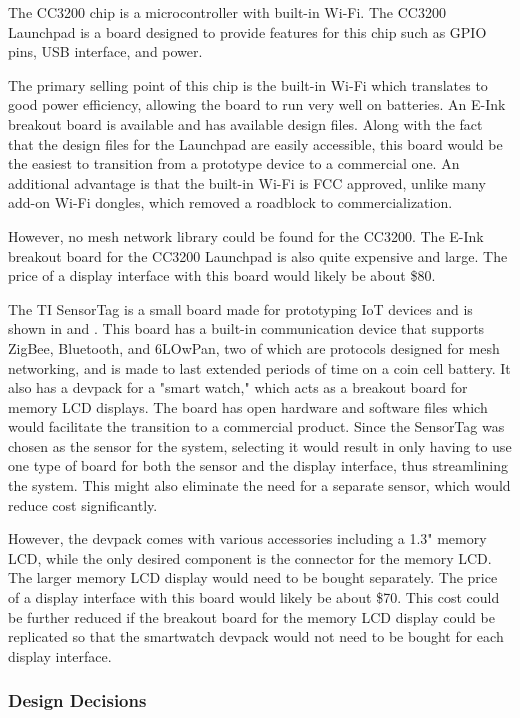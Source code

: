 \documentclass[PPFS.tex]{template/subfiles}
\begin{document}
The CC3200 chip is a microcontroller with built-in Wi-Fi. The CC3200 Launchpad is a board designed to provide features for this chip such as GPIO pins, USB interface, and power.

The primary selling point of this chip is the built-in Wi-Fi which translates to good power efficiency, allowing the board to run very well on batteries. An E-Ink breakout board is available and has available design files. Along with the fact that the design files for the Launchpad are easily accessible, this board would be the easiest to transition from a prototype device to a commercial one. An additional advantage is that the built-in Wi-Fi is FCC approved, unlike many add-on Wi-Fi dongles, which removed a roadblock to commercialization.

However, no mesh network library could be found for the CC3200. The E-Ink breakout board for the CC3200 Launchpad is also quite expensive and large. The price of a display interface with this board would likely be about \$80.

The TI SensorTag is a small board made for prototyping IoT devices and is shown in  and . This board has a built-in communication device that supports ZigBee, Bluetooth, and 6LOwPan, two of which are protocols designed for mesh networking, and is made to last extended periods of time on a coin cell battery. It also has a devpack for a "smart watch," which acts as a breakout board for memory LCD displays. The board has open hardware and software files which would facilitate the transition to a commercial product. Since the SensorTag was chosen as the sensor for the system, selecting it would result in only having to use one type of board for both the sensor and the display interface, thus streamlining the system. This might also eliminate the need for a separate sensor, which would reduce cost significantly.

However, the devpack comes with various accessories including a 1.3" memory LCD, while the only desired component is the connector for the memory LCD. The larger memory LCD display would need to be bought separately. The price of a display interface with this board would likely be about \$70. This cost could be further reduced if the breakout board for the memory LCD display could be replicated so that the smartwatch devpack would not need to be bought for each display interface.

\subsubsection{Design Decisions}
\end{document}
